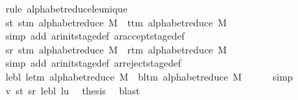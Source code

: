 \begin{isabellebody}
\ {\isacharparenleft}{\kern0pt}rule\ alphabet{\isacharunderscore}{\kern0pt}reduce{\isacharunderscore}{\kern0pt}le{\isacharunderscore}{\kern0pt}unique{\isacharparenright}{\kern0pt}\isanewline
\ \ \isamarkupfalse%
\ st{\isacharcolon}{\kern0pt}\ {\isachardoublequoteopen}s{\isacharunderscore}{\kern0pt}tm\ {\isacharparenleft}{\kern0pt}alphabet{\isacharunderscore}{\kern0pt}reduce\ M{\isacharparenright}{\kern0pt}\ {\isasymnoteq}\ t{\isacharunderscore}{\kern0pt}tm\ {\isacharparenleft}{\kern0pt}alphabet{\isacharunderscore}{\kern0pt}reduce\ M{\isacharparenright}{\kern0pt}{\isachardoublequoteclose}\isanewline
\ \ \ \ \isamarkupfalse%
\ {\isacharparenleft}{\kern0pt}simp\ add{\isacharcolon}{\kern0pt}\ ar{\isacharunderscore}{\kern0pt}init{\isacharunderscore}{\kern0pt}stage{\isacharunderscore}{\kern0pt}def\ ar{\isacharunderscore}{\kern0pt}accept{\isacharunderscore}{\kern0pt}stage{\isacharunderscore}{\kern0pt}def{\isacharparenright}{\kern0pt}\isanewline
\ \ \isamarkupfalse%
\ sr{\isacharcolon}{\kern0pt}\ {\isachardoublequoteopen}s{\isacharunderscore}{\kern0pt}tm\ {\isacharparenleft}{\kern0pt}alphabet{\isacharunderscore}{\kern0pt}reduce\ M{\isacharparenright}{\kern0pt}\ {\isasymnoteq}\ r{\isacharunderscore}{\kern0pt}tm\ {\isacharparenleft}{\kern0pt}alphabet{\isacharunderscore}{\kern0pt}reduce\ M{\isacharparenright}{\kern0pt}{\isachardoublequoteclose}\isanewline
\ \ \ \ \isamarkupfalse%
\ {\isacharparenleft}{\kern0pt}simp\ add{\isacharcolon}{\kern0pt}\ ar{\isacharunderscore}{\kern0pt}init{\isacharunderscore}{\kern0pt}stage{\isacharunderscore}{\kern0pt}def\ ar{\isacharunderscore}{\kern0pt}reject{\isacharunderscore}{\kern0pt}stage{\isacharunderscore}{\kern0pt}def{\isacharparenright}{\kern0pt}\isanewline
\ \ \isamarkupfalse%
\ lebl{\isacharcolon}{\kern0pt}\ {\isachardoublequoteopen}le{\isacharunderscore}{\kern0pt}tm\ {\isacharparenleft}{\kern0pt}alphabet{\isacharunderscore}{\kern0pt}reduce\ M{\isacharparenright}{\kern0pt}\ {\isasymnoteq}\ bl{\isacharunderscore}{\kern0pt}tm\ {\isacharparenleft}{\kern0pt}alphabet{\isacharunderscore}{\kern0pt}reduce\ M{\isacharparenright}{\kern0pt}{\isachardoublequoteclose}\isanewline
\ \ \ \ \isamarkupfalse%
\ simp\isanewline
\ \ \isamarkupfalse%
\ v\ st\ sr\ lebl\ lu\ \isamarkupfalse%
\ {\isacharquery}{\kern0pt}thesis\ \isamarkupfalse%
\ blast\isanewline
{}\isamarkupfalse%
%
\endisatagproof
{\isafoldproof}%
%
\isadelimproof
%
\endisadelimproof
%
\begin{isamarkuptext}%

\end{isamarkuptext}
\end{isabellebody}
